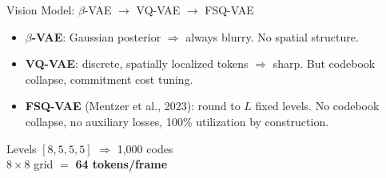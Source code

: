 \documentclass[aspectratio=169]{beamer}
\newcommand{\spatialres}{8}          %
\newcommand{\ntokens}{64}            %
\newcommand{\fsqcodes}{1{,}000}      %
\begin{document}
\begin{frame}{Vision Model: $\beta$-VAE $\to$ VQ-VAE $\to$ FSQ-VAE}
  \begin{itemize}
    \item \textbf{$\beta$-VAE}: Gaussian posterior $\Rightarrow$ always blurry. No spatial structure.
    \item \textbf{VQ-VAE}: discrete, spatially localized tokens $\Rightarrow$ sharp. But codebook collapse, commitment cost tuning.
    \item \textbf{FSQ-VAE} (Mentzer et al., 2023): round to $L$ fixed levels. No codebook collapse, no auxiliary losses, 100\% utilization by construction.
  \end{itemize}

  \vspace{0.3em}
  \begin{center}
    Levels $[8,5,5,5]$ $\Rightarrow$ \fsqcodes{} codes\\
    $\spatialres\times\spatialres$ grid $=$ \textbf{\ntokens{} tokens/frame}
  \end{center}
\end{frame}
\end{document}
